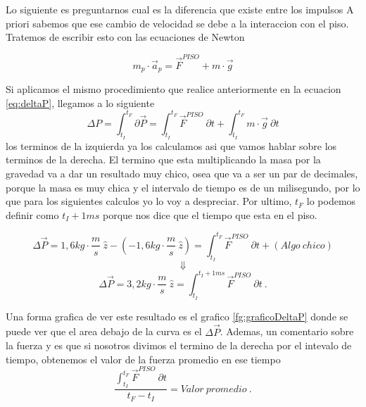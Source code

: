 \documentclass[../Main.tex]{subfiles}
\begin{document}
{
    Lo siguiente es preguntarnos cual es la diferencia que existe entre los impulsos
    A priori sabemos que ese cambio de velocidad se debe a la interaccion con el
    piso. Tratemos de escribir esto con las ecuaciones de Newton

    \begin{equation*}
        m_p \cdot \vec{a}_p = \vec{F} ^{PISO} + m \cdot \vec{g}
    \end{equation*}

    Si aplicamos el mismo procedimiento que realice anteriormente en la ecuacion
    \ref{eq:deltaP}, llegamos a lo siguiente
    \begin{equation*}
        \Delta P = \int _{t_I}^{t_F} \partial \vec{P} = \int _{t_I}^{t_F} \vec{F} ^{PISO} \ \partial t + \int _{t_I}^{t_F} m \cdot \vec{g} \ \partial t
    \end{equation*}
    los terminos de la izquierda ya los calculamos asi que vamos hablar sobre los
    terminos de la derecha. El termino que esta multiplicando la masa por la
    gravedad va a dar un resultado muy chico, osea que va a ser un par de decimales,
    porque la masa es muy chica y el intervalo de tiempo es de un milisegundo, por
    lo que para los siguientes calculos yo lo voy a despreciar. Por ultimo,
    $t_F$ lo podemos definir como $t_I + 1ms$ porque nos dice que el tiempo que
    esta en el piso.

    \begin{equation*}
        \Delta \vec{P} = 1,6 kg \cdot \frac{m}{s} \ \hat{z} - \left( - 1,6 kg \cdot \frac{m}{s} \ \hat{z} \right) = \int _{t_I}^{t_F} \vec{F} ^{PISO} \ \partial t + (Algo \ chico)
    \end{equation*}
    \begin{equation*}
        \Downarrow
    \end{equation*}
    \begin{equation*}
        \Delta \vec{P} = 3,2 kg \cdot \frac{m}{s} \ \hat{z} = \int _{t_I}^{t_I + 1ms} \vec{F} ^{PISO} \ \partial t \ .
    \end{equation*}

    Una forma grafica de ver este resultado es el grafico \ref{fg:graficoDeltaP}
    donde se puede ver que el area debajo de la curva es el $\Delta \vec{P}$.
    Ademas, un comentario sobre la fuerza y es que si nosotros divimos el termino
    de la derecha por el intevalo de tiempo, obtenemos el valor de la fuerza
    promedio en ese tiempo
    \begin{equation*}
        \frac{\int _{t_I}^{t_F} \vec{F} ^{PISO} \ \partial t}{t_F - t_I} = Valor \ promedio \ .
    \end{equation*}

}
\end{document}
